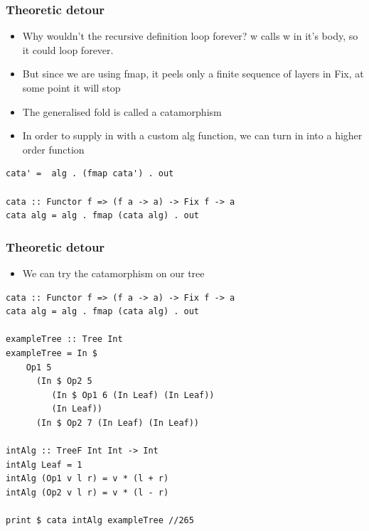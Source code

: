 \documentclass[10pt]{beamer}
\begin{document}
\begin{frame}[fragile]
\frametitle{Theoretic detour}

\begin{itemize}
\item Why wouldn't the recursive definition loop forever? w calls w in it's body, so it could loop forever. 
\item But since we are using fmap, it peels only a finite sequence of layers in Fix, at some point it will stop
\item The generalised fold is called a catamorphism
\item In order to supply in with a custom alg function, we can turn in into a higher order function	
\end{itemize}

\begin{lstlisting}
cata' =  alg . (fmap cata') . out

cata :: Functor f => (f a -> a) -> Fix f -> a
cata alg = alg . fmap (cata alg) . out
\end{lstlisting}

\end{frame}



\begin{frame}[fragile]
\frametitle{Theoretic detour}

\begin{itemize}
\item We can try the catamorphism on our tree
\end{itemize}

\begin{lstlisting}
cata :: Functor f => (f a -> a) -> Fix f -> a
cata alg = alg . fmap (cata alg) . out

exampleTree :: Tree Int
exampleTree = In $ 
    Op1 5 
      (In $ Op2 5 
         (In $ Op1 6 (In Leaf) (In Leaf))
         (In Leaf)) 
      (In $ Op2 7 (In Leaf) (In Leaf))

intAlg :: TreeF Int Int -> Int
intAlg Leaf = 1
intAlg (Op1 v l r) = v * (l + r)
intAlg (Op2 v l r) = v * (l - r)

print $ cata intAlg exampleTree //265

\end{lstlisting}

\end{frame}
\end{document}
